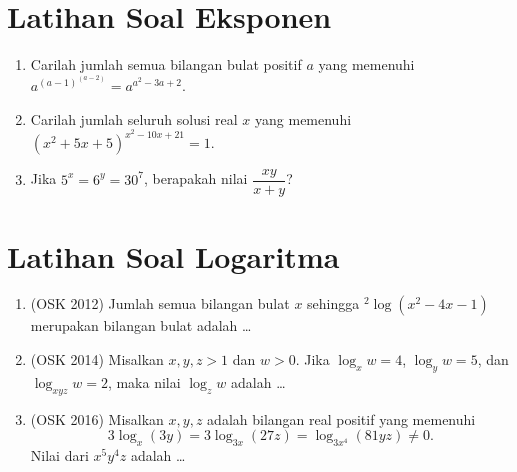 \documentclass[a4paper]{article}
\begin{document}
\section{Latihan Soal Eksponen}
\begin{enumerate}
    \item Carilah jumlah semua bilangan bulat positif $a$ yang memenuhi $a^{(a-1)^{(a-2)}}=a^{a^2-3a+2}$.
    
    \item Carilah jumlah seluruh solusi real $x$ yang memenuhi $(x^2+5x+5)^{x^2-10x+21}=1.$
    
    \item Jika $5^x=6^y=30^7$, berapakah nilai $\dfrac{xy}{x+y}$?
\end{enumerate}

\section{Latihan Soal Logaritma}
\begin{enumerate}  
    \item (OSK 2012) Jumlah semua bilangan bulat $x$ sehingga $^2 \log (x^2-4x-1)$ merupakan bilangan bulat adalah \dots
    
    \item (OSK 2014) Misalkan $x,y,z>1$ dan $w>0$. Jika $\log_x w = 4$, $\log_y w = 5$, dan $\log_{xyz} w = 2$, maka nilai $\log_z w$ adalah \dots 

    \item (OSK 2016) Misalkan $x,y,z$ adalah bilangan real positif yang memenuhi $$3 \log_x (3y) = 3 \log_{3x} (27z) = \log_{3x^4} (81yz) \neq 0.$$ Nilai dari $x^5y^4z$ adalah \dots
\end{enumerate}
\end{document}

